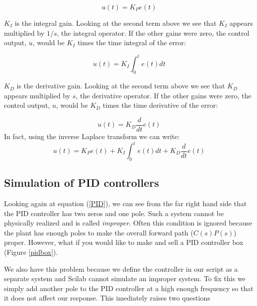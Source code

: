 \[
u(t) = K_P e(t)
\]




{\bf $K_I$} is the integral gain.
Looking at the second term above we see that $K_I$ appears multiplied by $1/s$, the integral operator.  If the other gains were zero, the control output, $u$, would be $K_I$ times the time integral of the error:	%

\[
u(t) = K_I \int_0^t e(t) dt
\]






{\bf $K_D$} is the derivative gain.
Looking at the second term above we see that $K_D$ appears multiplied by $s$, the derivative operator.  If the other gains were zero, the control output, $u$, would be $K_D$ times the time derivative of the error:	%

\[
u(t) = K_D \frac{d}{dt}e(t)
\]
In fact, using the inverse Laplace transform we can write:
\[
u(t) = K_P e(t)  + K_I \int_0^t e(t) dt + K_D \frac{d}{dt}e(t)
\]
 






\subsection{Simulation of PID controllers}

Looking again at equation (\ref{PID}), we can see from the far right hand side that the PID controller has two zeros and one pole.   Such a system cannot be physically realized and is called {\it improper}.   Often this condition is ignored because the plant has enough poles to make the overall forward path ($C(s)P(s)$) proper.  However, what if you would like to make and sell a PID controller box (Figure \ref{pidbox}).
 
 
We also have this problem because we define the controller in our script as a separate system and Scilab cannot simulate an improper system.
To fix this we simply add another pole to the PID controller at a high enough frequency so that it does not affect our response.  This imediately raises two questions


